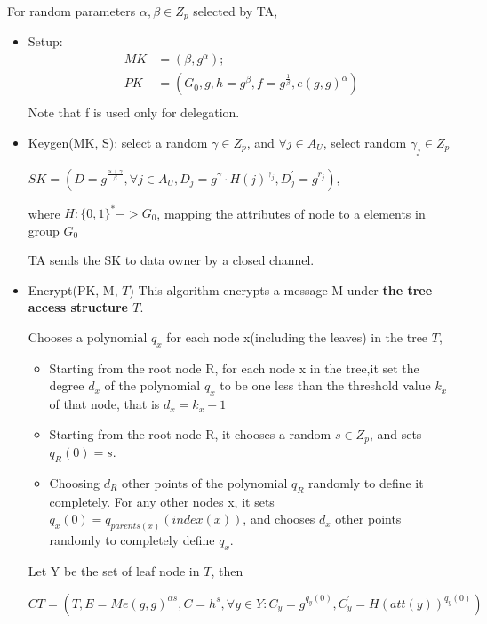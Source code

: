 \documentclass[a4paper,11pt]{article}
\begin{document}
For random parameters $ \alpha, \beta  \in Z_p$ selected by TA, 

\begin{itemize}
\item Setup:  
 \begin{equation} 
  \begin{split}
  	MK &= (\beta, g^{\alpha});  \\
	PK &= (G_0, g, h=g^{\beta}, f=g^{\frac{1}{\beta}}, e(g, g)^{\alpha})  \\
  \end{split}
  \end{equation}
  Note that f is used only for delegation.
  
\item Keygen(MK, S):   select a random $ \gamma \in Z_p $, and  $ \forall j \in A_U$, select random ${\gamma}_j \in Z_p $  

$SK = (D = g^{\frac{\alpha + \gamma}{\beta}},  \forall j \in A_U,  D_j = g^{\gamma} · H(j)^{{\gamma}_j}, D_{j}^{'} = g^{r_j}),  $

where $H: \{0, 1\}^{*} -> G_0$, mapping the attributes of node to a elements in group $G_0$

TA sends the SK to data owner by a closed channel. 

\item Encrypt(PK, M, $T$)
This algorithm encrypts a message M under \textbf{the tree access structure $T$}.


Chooses a polynomial $q_x$ for each node x(including the leaves) in the tree $T$,  
\begin{itemize}
	\item Starting from the root node R, for each node x in the tree,it set the degree $d_x$ of the polynomial $q_x$ to be one less than the threshold value $k_x$ of that node, that is $d_x = k_x - 1$
	\item Starting from the root node R, it chooses a random $s \in Z_p$, and sets $q_R(0) = s$. 
	\item Choosing $d_R$ other points of the polynomial $q_R$ randomly to define it completely. For any other nodes x, it sets $q_x(0) = {q_{parents(x)}(index(x))}$, and chooses $d_x$ other points randomly to completely define $q_x$.  
\end{itemize}

Let Y be the set of leaf node in $T$,  then

$ CT = (T, E = Me(g, g)^{\alpha{s}}, C = h^s,  \forall y \in Y:  C_y = g^{q_y(0)}, C_y^{'} = H(att(y))^{q_y(0)}) $  


\end{itemize}
\end{document}
